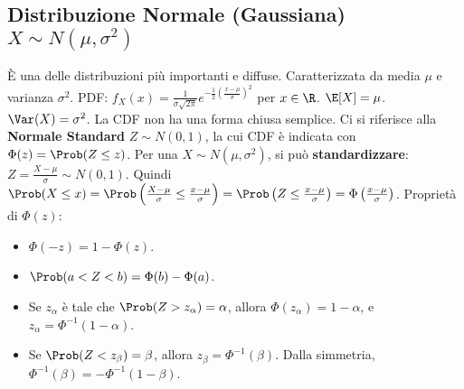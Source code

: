 \subsection{Distribuzione Normale (Gaussiana) \texorpdfstring{$X \sim N(\mu, \sigma^2)$}{X ~ N(mu, sigma^2)}}
È una delle distribuzioni più importanti e diffuse. Caratterizzata da media $\mu$ e varianza $\sigma^2$.
PDF: $f_X(x) = \frac{1}{\sigma\sqrt{2\pi}} e^{-\frac{1}{2}\left(\frac{x-\mu}{\sigma}\right)^2}$ per $x \in \R$.
$\E[X] = \mu$.
$\Var(X) = \sigma^2$.
La CDF non ha una forma chiusa semplice. Ci si riferisce alla \textbf{Normale Standard} $Z \sim N(0,1)$, la cui CDF è indicata con $\Phi(z) = \Prob(Z \le z)$.
Per una $X \sim N(\mu, \sigma^2)$, si può \textbf{standardizzare}: $Z = \frac{X-\mu}{\sigma} \sim N(0,1)$.
Quindi $\Prob(X \le x) = \Prob\left(\frac{X-\mu}{\sigma} \le \frac{x-\mu}{\sigma}\right) = \Prob\left(Z \le \frac{x-\mu}{\sigma}\right) = \Phi\left(\frac{x-\mu}{\sigma}\right)$.
Proprietà di $\Phi(z)$:
\begin{itemize}
    \item $\Phi(-z) = 1 - \Phi(z)$.
    \item $\Prob(a < Z < b) = \Phi(b) - \Phi(a)$.
    \item Se $z_\alpha$ è tale che $\Prob(Z > z_\alpha) = \alpha$, allora $\Phi(z_\alpha)=1-\alpha$, e $z_\alpha = \Phi^{-1}(1-\alpha)$.
    \item Se $\Prob(Z < z_\beta) = \beta$, allora $z_\beta = \Phi^{-1}(\beta)$. Dalla simmetria, $\Phi^{-1}(\beta) = -\Phi^{-1}(1-\beta)$.
\end{itemize}

